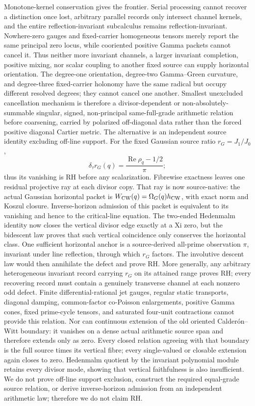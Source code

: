 \documentclass[11pt]{article}
\theoremstyle{definition}
\theoremstyle{remark}
\newcommand{\Rea}{\operatorname{Re}}
\begin{document}
Monotone-kernel conservation gives the frontier.  Serial processing cannot recover a
distinction once lost, arbitrary parallel records only intersect channel
kernels, and the entire reflection-invariant subcalculus remains
reflection-invariant.  Nowhere-zero gauges and fixed-carrier homogeneous
tensors merely report the same principal zero locus, while cooriented
positive Gamma packets cannot cancel it.  Thus neither more invariant
channels, a larger invariant completion, positive mixing, nor scalar
coupling to another fixed source can supply horizontal orientation.
The degree-one orientation, degree-two Gamma--Green curvature, and
degree-three fixed-carrier holonomy have the same radical but occupy
  different resolved degrees; they cannot cancel one another.  Smallest
unexcluded cancellation mechanism is therefore a divisor-dependent or
non-absolutely-summable singular, signed, non-principal same-full-grade
arithmetic relation before coarsening, carried by polarized off-diagonal
data rather than the forced positive diagonal Cartier metric.  The
alternative is
an independent source identity excluding off-line support.  For the fixed
Gaussian source ratio
\(r_G=J_1/J_0\),
\[
        \delta_\tau r_G(q)=\frac{\Rea\rho_q-1/2}{\pi};
\]
thus its vanishing is RH before any scalarization.  Fibrewise exactness
leaves one residual projective ray at each divisor copy.  That ray is now
source-native: the actual Gaussian horizontal packet is
\(W_{\rm CW}(q)=\Omega_G(q)h_{\rm CW}\), with exact norm and Koszul closure.
Inverse-horizon admission of this packet is equivalent to its vanishing and
hence to the critical-line equation.  The two-ended Hedenmalm
identity now closes the vertical divisor edge exactly at a Xi zero, but the
bidescent law proves that such vertical coincidence only conserves the
horizontal class.  One sufficient horizontal anchor
is a source-derived all-prime observation \(\pi\), invariant under line
reflection, through which \(r_G\) factors.  The involutive descent law would
then annihilate the defect and prove RH.  More generally, any arbitrary
heterogeneous invariant record carrying \(r_G\) on its attained range proves
RH; every recovering record must contain a genuinely transverse channel at
each nonzero odd defect.  Finite differential-rational jet gauges, regular
static transports, diagonal damping, common-factor co-Poisson enlargements,
positive Gamma cones, fixed prime-cycle tensors, and saturated four-unit
contractions cannot provide this relation.  Nor can continuous extension of the old oriented
Calder\'on--Witt boundary: it vanishes on a dense actual arithmetic source
span and therefore extends only as zero.  Every closed relation agreeing
with that boundary is the full source times its vertical fibre; every
single-valued or closable extension again closes to zero.  Hedenmalm quotient by the invariant polynomial module retains every
divisor mode, showing that vertical faithfulness is also insufficient.  We
do not prove off-line support exclusion, construct the required equal-grade
source relation, or derive inverse-horizon admission from an independent
arithmetic law; therefore we do not claim RH.
\end{document}

